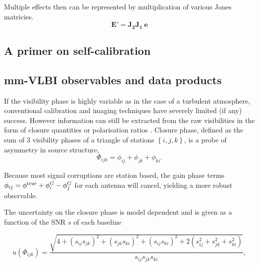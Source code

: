 Multiple effects then can be represented by multiplication of various Jones matricies.
\begin{equation*}
\mathbf{E'} = \mathbf{J_2 J_1\ e}
\end{equation*}




\subsection{A primer on self-calibration}




\subsection{mm-VLBI observables and data products}

If the visibility phase is highly variable as in the case of a turbulent atmosphere,  conventional calibration and imaging techniques have severely limited (if any) success. However information can still be extracted from the raw visibilities in the form of closure quantities \citep{Monnier_2007} or polarisation ratios \citep{Fish_2009}. Closure phase, defined as the sum of 3 visibility phases of a triangle of stations $\left\{i,j,k\right\}$, is a probe of asymmetry in source structure,
\begin{equation}
\Phi_{ijk} = \phi_{ij}+\phi_{jk}+\phi_{ki}.
\end{equation}

\noindent Because most signal corruptions are station based, the gain phase terms $\phi_{ij}=\phi^{\rm true}+ \phi^G_i -\phi^G_j$ for each antenna will cancel, yielding a more robust observable. 

The uncertainty on the closure phase is model dependent \citep{Rogers_1995} and is given as a function of the SNR $s$ of each baseline 

\begin{equation}\label{eq:ucp}
u(\Phi_{ijk}) = \frac{\sqrt{4 + (s_{ij}s_{jk})^2 + (s_{jk}s_{ki})^2 + (s_{ij}s_{ki})^2 +
                        2(s_{ij}^2+s_{jk}^2+s_{ki}^2)}}{s_{ij}s_{jk}s_{ki}},
\end{equation}

